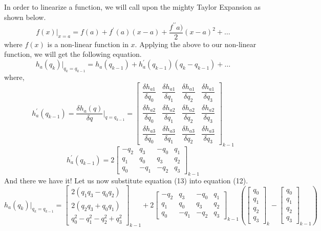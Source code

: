 \documentclass[a4paper,12pt]{book}
\begin{document}
In order to linearize a function, we will call upon the mighty Taylor Expansion as shown below.
\begin{equation}
    f(x)|_{x=a} = f(a) + f^\prime(a)(x-a) + \dfrac{f^{\prime\prime} a)}{2}(x-a)^2 + \ldots
\end{equation}
where $f(x)$ is a non-linear function in $x$. Applying the above to our non-linear function, we will get the following equation.
\begin{equation}
    h_a(q_k)|_{q_k=q_{k-1}} = h_a(q_{k-1}) + h^\prime_a(q_{k-1})(q_k - q_{k-1}) + \ldots
\end{equation}
where,
\begin{equation}
    h^\prime_a(q_{k-1}) = \dfrac{\delta{h_a(q)}}{\delta{q}}|_{q=q_{k-1}} = \begin{bmatrix} \dfrac{\delta{h_{a1}}}{\delta{q_0}} & \dfrac{\delta{h_{a1}}}{\delta{q_1}} & \dfrac{\delta{h_{a1}}}{\delta{q_2}} & \dfrac{\delta{h_{a1}}}{\delta{q_3}} \\ \dfrac{\delta{h_{a2}}}{\delta{q_0}} & \dfrac{\delta{h_{a2}}}{\delta{q_1}} & \dfrac{\delta{h_{a2}}}{\delta{q_2}} & \dfrac{\delta{h_{a2}}}{\delta{q_3}} \\ \dfrac{\delta{h_{a3}}}{\delta{q_0}} & \dfrac{\delta{h_{a3}}}{\delta{q_1}} & \dfrac{\delta{h_{a3}}}{\delta{q_2}} & \dfrac{\delta{h_{a3}}}{\delta{q_3}} \end{bmatrix}_{k-1}
\end{equation}
\begin{equation}
    h^\prime_a(q_{k-1}) = 2\begin{bmatrix} -q_2 & q_3 & -q_0 & q_1 \\ q_1 & q_0 & q_3 & q_2 \\ q_0 & -q_1 & -q_2 & q_3 \end{bmatrix}_{k-1}
\end{equation}
And there we have it! Let us now substitute equation (13) into equation (12).
\begin{equation}
    h_a(q_k)|_{q_k=q_{k-1}} = \begin{bmatrix} 2(q_1q_3 - q_0q_2) \\ 2(q_2q_3 + q_0q_1) \\ q_0^2 - q_1^2 - q_2^2 + q_3^2 \end{bmatrix}_{k-1} + 2\begin{bmatrix} -q_2 & q_3 & -q_0 & q_1 \\ q_1 & q_0 & q_3 & q_2 \\ q_0 & -q_1 & -q_2 & q_3 \end{bmatrix}_{k-1} \left( \begin{bmatrix} q_0 \\ q_1 \\ q_2 \\ q_3 \end{bmatrix}_k - \begin{bmatrix} q_0 \\ q_1 \\ q_2 \\ q_3 \end{bmatrix}_{k-1} \right)
\end{equation}
\end{document}
